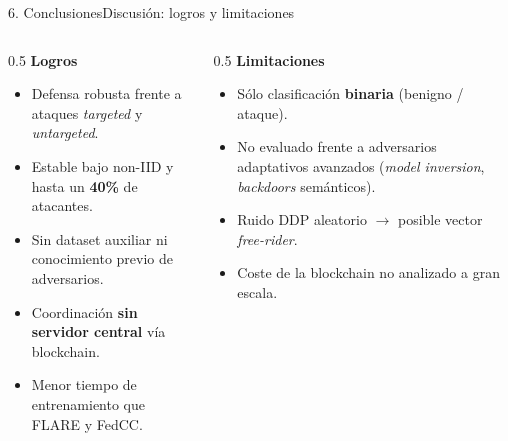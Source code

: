 \begin{frame}{6. Conclusiones}{Discusión: logros y limitaciones}
  \begin{columns}[T]
    \begin{column}{0.5\textwidth}
      \textbf{\textcolor{UMUblue}{Logros}}\\[0.3em]
      \begin{itemize}\small
        \item Defensa robusta frente a ataques \textit{targeted} y \textit{untargeted}.
        \item Estable bajo non-IID y hasta un \textbf{40\%} de atacantes.
        \item Sin dataset auxiliar ni conocimiento previo de adversarios.
        \item Coordinación \textbf{sin servidor central} vía blockchain.
        \item Menor tiempo de entrenamiento que FLARE y FedCC.
      \end{itemize}
    \end{column}
    \begin{column}{0.5\textwidth}
      \textbf{\textcolor{red!70!black}{Limitaciones}}\\[0.3em]
      \begin{itemize}\small
        \item Sólo clasificación \textbf{binaria} (benigno / ataque).
        \item No evaluado frente a adversarios adaptativos avanzados (\textit{model inversion}, \textit{backdoors} semánticos).
        \item Ruido DDP aleatorio $\to$ posible vector \textit{free-rider}.
        \item Coste de la blockchain no analizado a gran escala.
      \end{itemize}
    \end{column}
  \end{columns}
\end{frame}


